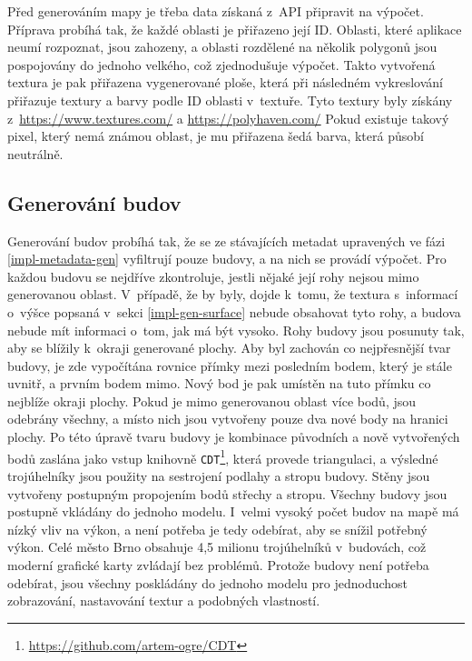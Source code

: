 Před generováním mapy je třeba data získaná z~API připravit na výpočet. Příprava probíhá tak, že každé oblasti je přiřazeno její ID. Oblasti, které aplikace neumí rozpoznat, jsou zahozeny, a oblasti rozdělené na několik polygonů jsou pospojovány do jednoho velkého, což zjednodušuje výpočet. Takto vytvořená textura je pak přiřazena vygenerované ploše, která při následném vykreslování přiřazuje textury a barvy podle ID oblasti v~textuře. Tyto textury byly získány z~\href{https://www.textures.com/}{https://www.textures.com/} a \href{https://polyhaven.com/}{https://polyhaven.com/} Pokud existuje takový pixel, který nemá známou oblast, je mu přiřazena šedá barva, která působí neutrálně.


\subsection*{Generování budov}
Generování budov probíhá tak, že se ze stávajících metadat upravených ve fázi \ref{impl-metadata-gen} vyfiltrují pouze budovy, a na nich se provádí výpočet. Pro každou budovu se nejdříve zkontroluje, jestli nějaké její rohy nejsou mimo generovanou oblast. V~případě, že by byly, dojde k~tomu, že textura s~informací o~výšce popsaná v~sekci \ref{impl-gen-surface} nebude obsahovat tyto rohy, a budova nebude mít informaci o~tom, jak má být vysoko. Rohy budovy jsou posunuty tak, aby se blížily k~okraji generované plochy. Aby byl zachován co nejpřesnější tvar budovy, je zde vypočítána rovnice přímky mezi posledním bodem, který je stále uvnitř, a prvním bodem mimo. Nový bod je pak umístěn na tuto přímku co nejblíže okraji plochy. Pokud je mimo generovanou oblast více bodů, jsou odebrány všechny, a místo nich jsou vytvořeny pouze dva nové body na hranici plochy. Po této úpravě tvaru budovy je kombinace původních a nově vytvořených bodů zaslána jako vstup knihovně \verb|CDT|\footnote{\href{https://github.com/artem-ogre/CDT}{https://github.com/artem-ogre/CDT}}, která provede triangulaci, a výsledné trojúhelníky jsou použity na sestrojení podlahy a stropu budovy. Stěny jsou vytvořeny postupným propojením bodů střechy a stropu. Všechny budovy jsou postupně vkládány do jednoho modelu. I~velmi vysoký počet budov na mapě má nízký vliv na výkon, a není potřeba je tedy odebírat, aby se snížil potřebný výkon. Celé město Brno obsahuje 4,5 milionu trojúhelníků v~budovách, což moderní grafické karty zvládají bez problémů. Protože budovy není potřeba odebírat, jsou všechny poskládány do jednoho modelu pro jednoduchost zobrazování, nastavování textur a podobných vlastností.

